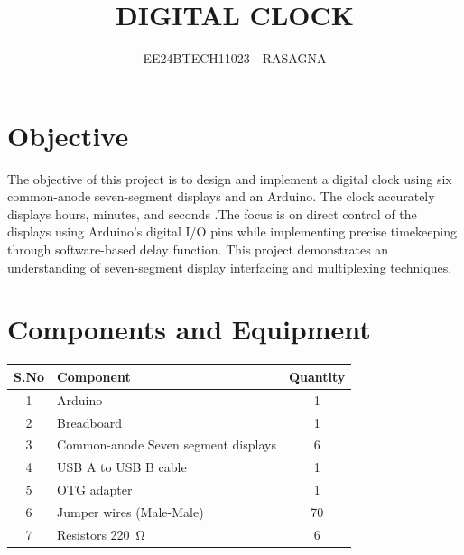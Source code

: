 \documentclass[journal]{IEEEtran}
\begin{document}

\vspace{3cm}

\title{DIGITAL CLOCK}
\author{EE24BTECH11023 - RASAGNA}

{\let\newpage\relax\maketitle}

\renewcommand{\thefigure}{\theenumi}
\renewcommand{\thetable}{\theenumi}
\setlength{\intextsep}{10pt} %


\renewcommand{\thetable}{\theenumi}

\section{Objective}
The objective of this project is to design and implement a digital clock using six common-anode seven-segment displays and an Arduino. The clock accurately displays hours, minutes, and seconds .The focus is on direct control of the displays using Arduino's digital I/O pins while implementing precise timekeeping through software-based delay function. This project demonstrates an understanding of seven-segment display interfacing and multiplexing techniques.

\section{Components and Equipment}

\begin{table}[h]
    \centering
    \renewcommand{\arraystretch}{1.2}
    \begin{tabular}{|c|l|c|}
        \hline
        \textbf{S.No} & \textbf{Component} & \textbf{Quantity} \\
        \hline
         1& Arduino  & 1 \\
         2& Breadboard & 1 \\
         3& Common-anode Seven segment displays & 6  \\
         4& USB A to USB B cable & 1 \\
         5& OTG adapter & 1 \\
         6& Jumper wires (Male-Male)& 70 \\
         7& Resistors \SI{220}{\ohm} & 6 \\
        \hline
    \end{tabular}
\end{table}
\end{document}
